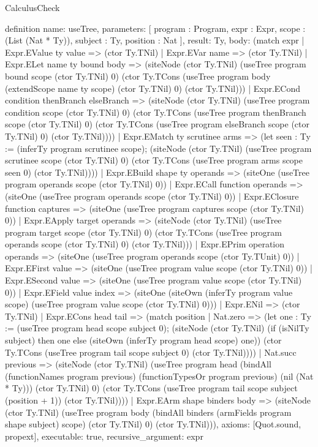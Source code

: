 \begin{lexlean}{CalculusCheck}
\begin{semanticmodule}
definition{
  name: useTree,
  parameters: [
    program : Program,
    expr : Expr,
    scope : (List (Nat * Ty)),
    subject : Ty,
    position : Nat
  ],
  result: Ty,
  body: (match expr
    | Expr.EValue ty value => (ctor Ty.TNil)
    | Expr.EVar name => (ctor Ty.TNil)
    | Expr.ELet name ty bound body => (siteNode (ctor Ty.TNil) (useTree program bound scope (ctor Ty.TNil) 0) (ctor Ty.TCons (useTree program body (extendScope name ty scope) (ctor Ty.TNil) 0) (ctor Ty.TNil)))
    | Expr.ECond condition thenBranch elseBranch => (siteNode (ctor Ty.TNil) (useTree program condition scope (ctor Ty.TNil) 0) (ctor Ty.TCons (useTree program thenBranch scope (ctor Ty.TNil) 0) (ctor Ty.TCons (useTree program elseBranch scope (ctor Ty.TNil) 0) (ctor Ty.TNil))))
    | Expr.EMatch ty scrutinee arms => (let seen : Ty := (inferTy program scrutinee scope); (siteNode (ctor Ty.TNil) (useTree program scrutinee scope (ctor Ty.TNil) 0) (ctor Ty.TCons (useTree program arms scope seen 0) (ctor Ty.TNil))))
    | Expr.EBuild shape ty operands => (siteOne (useTree program operands scope (ctor Ty.TNil) 0))
    | Expr.ECall function operands => (siteOne (useTree program operands scope (ctor Ty.TNil) 0))
    | Expr.EClosure function captures => (siteOne (useTree program captures scope (ctor Ty.TNil) 0))
    | Expr.EApply target operands => (siteNode (ctor Ty.TNil) (useTree program target scope (ctor Ty.TNil) 0) (ctor Ty.TCons (useTree program operands scope (ctor Ty.TNil) 0) (ctor Ty.TNil)))
    | Expr.EPrim operation operands => (siteOne (useTree program operands scope (ctor Ty.TUnit) 0))
    | Expr.EFirst value => (siteOne (useTree program value scope (ctor Ty.TNil) 0))
    | Expr.ESecond value => (siteOne (useTree program value scope (ctor Ty.TNil) 0))
    | Expr.EField value index => (siteOne (siteOwn (inferTy program value scope) (useTree program value scope (ctor Ty.TNil) 0)))
    | Expr.ENil => (ctor Ty.TNil)
    | Expr.ECons head tail => (match position
      | Nat.zero => (let one : Ty := (useTree program head scope subject 0); (siteNode (ctor Ty.TNil) (if (isNilTy subject) then one else (siteOwn (inferTy program head scope) one)) (ctor Ty.TCons (useTree program tail scope subject 0) (ctor Ty.TNil))))
      | Nat.succ previous => (siteNode (ctor Ty.TNil) (useTree program head (bindAll (functionNames program previous) (functionTypesOr program previous) (nil (Nat * Ty))) (ctor Ty.TNil) 0) (ctor Ty.TCons (useTree program tail scope subject (position + 1)) (ctor Ty.TNil))))
    | Expr.EArm shape binders body => (siteNode (ctor Ty.TNil) (useTree program body (bindAll binders (armFields program shape subject) scope) (ctor Ty.TNil) 0) (ctor Ty.TNil))),
  axioms: [Quot.sound, propext],
  executable: true,
  recursive_argument: expr
}


\end{semanticmodule}
\end{lexlean}
